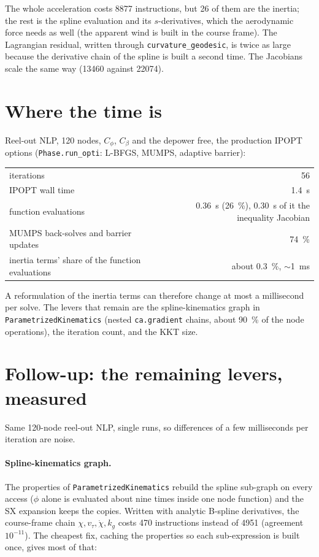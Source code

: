 \documentclass[11pt,a4paper]{article}
\newcommand{\code}[1]{\texttt{#1}}
\begin{document}
The whole acceleration costs 8877 instructions, but 26 of them are the inertia;
the rest is the spline evaluation and its $s$-derivatives, which the
aerodynamic force needs as well (the apparent wind is built in the course
frame). The Lagrangian residual, written through \code{curvature\_geodesic}, is
twice as large because the derivative chain of the spline is built a second
time. The Jacobians scale the same way (13460 against 22074).

\section{Where the time is}

Reel-out NLP, 120 nodes, $C_\phi$, $C_\beta$ and the depower free, the
production IPOPT options (\code{Phase.run\_opti}: L-BFGS, MUMPS, adaptive
barrier):

\begin{center}
\begin{tabular}{lr}
\toprule
iterations & 56 \\
IPOPT wall time & \SI{1.4}{s} \\
function evaluations & \SI{0.36}{s} (\SI{26}{\percent}), \SI{0.30}{s} of it the inequality Jacobian \\
MUMPS back-solves and barrier updates & \SI{74}{\percent} \\
inertia terms' share of the function evaluations & about \SI{0.3}{\percent}, $\sim$\SI{1}{ms} \\
\bottomrule
\end{tabular}
\end{center}

A reformulation of the inertia terms can therefore change at most a
millisecond per solve. The levers that remain are the spline-kinematics graph
in \code{ParametrizedKinematics} (nested \code{ca.gradient} chains, about
\SI{90}{\percent} of the node operations), the iteration count, and the KKT
size.

\section{Follow-up: the remaining levers, measured}

Same 120-node reel-out NLP, single runs, so differences of a few milliseconds
per iteration are noise.

\paragraph{Spline-kinematics graph.} The properties of
\code{ParametrizedKinematics} rebuild the spline sub-graph on every access
($\phi$ alone is evaluated about nine times inside one node function) and the
SX expansion keeps the copies. Written with analytic B-spline derivatives, the
course-frame chain $\chi, v_\tau, \dot\chi, k_g$ costs 470 instructions
instead of 4951 (agreement $10^{-11}$). The cheapest fix, caching the
properties so each sub-expression is built once, gives most of that:
\end{document}
